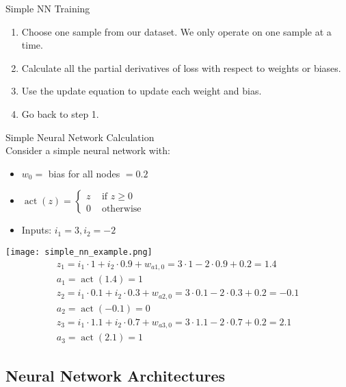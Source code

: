 \raggedcolumns
\columnbreak

\begin{KR}{Simple NN Training}
    \begin{enumerate}
        \item Choose one sample from our dataset. We only operate on one sample at a time.
        \item Calculate all the partial derivatives of loss with respect to weights or biases.
        \item Use the update equation to update each weight and bias.
        \item Go back to step 1.
    \end{enumerate}
\end{KR}

\begin{example2}{Simple Neural Network Calculation}\\
Consider a simple neural network with:
\begin{itemize}
    \item $w_0=$ bias for all nodes $=0.2$
    \item $\operatorname{act}(z)= \begin{cases}z & \text { if } z \geq 0 \\ 0 & \text { otherwise }\end{cases}$
    \item Inputs: $i_1=3, i_2=-2$
\end{itemize}
\texttt{[image: simple\_nn\_example.png]}
$$
\begin{gathered}
z_1=i_1 \cdot 1+i_2 \cdot 0.9+w_{a 1,0}=3 \cdot 1-2 \cdot 0.9+0.2=1.4 \\
a_1=\operatorname{act}(1.4)=1 \\
z_2=i_1 \cdot 0.1+i_2 \cdot 0.3+w_{a 2,0}=3 \cdot 0.1-2 \cdot 0.3+0.2=-0.1 \\
a_2=\operatorname{act}(-0.1)=0 \\
z_3=i_1 \cdot 1.1+i_2 \cdot 0.7+w_{a 3,0}=3 \cdot 1.1-2 \cdot 0.7+0.2=2.1 \\
a_3=\operatorname{act}(2.1)=1
\end{gathered}
$$

\end{example2}

\raggedcolumns
\columnbreak

\subsection{Neural Network Architectures}

